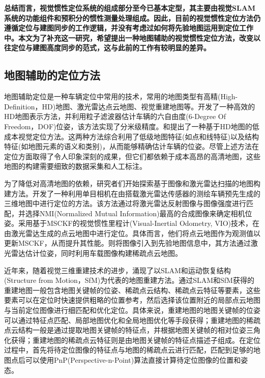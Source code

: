 \textbf{总结而言，视觉惯性定位系统的组成部分至今已基本定型，其主要由视觉SLAM系统的功能组件和预积分的惯性测量处理组成。因此，目前的视觉惯性定位方法仍遵循定位与建图同步的工作逻辑，并没有考虑过如何将先验地图运用到定位工作中。本文为了补充这一研究，希望提出一种地图辅助的视觉惯性定位方法，改变以往定位与建图高度同步的范式，这与此前的工作有较明显的差异。}

\subsection{地图辅助的定位方法}
地图辅助定位是一种车辆定位中常用的技术，常用的地图类型有高精(High-Definition，HD)地图、激光雷达点云地图、视觉重建地图等。\citet{jeong2020hdmi}开发了一种高效的HD地图表示方法，并利用粒子滤波器估计车辆的六自由度(6-Degree Of Freedom，DOF)位姿，该方法实现了分米级精度。\citet{xiao2020monocular}和\citet{guo2021coarse}提出了一种基于HD地图的低成本视觉定位方法。这两种方法综合利用了低级地图特征(如点和线特征)以及结构特征(如地图元素的语义和类别)，从而能够精确估计车辆的位姿。尽管上述方法在定位方面取得了令人印象深刻的成果，但它们都依赖于成本高昂的高清地图，这些地图的构建需要细致的数据采集和人工标注。

为了降低对高清地图的依赖，研究者们开始探索基于图像和激光雷达扫描的地图构建方法。\citet{stewart2012laps}开发了一种利用单目相机在由搭载激光雷达传感器的测绘车辆预先生成的三维地图中进行定位的方法。该方法通过将激光雷达反射图像与图像强度进行匹配，并选择NMI(Normalized Mutual Information)最高的合成图像来确定相机位姿。\citet{zuo2019visual}采用基于MSCKF的视觉惯性里程计(Visual-Inertial Odometry, VIO)技术，在由激光雷达生成的点云地图中进行定位。具体而言，他们将点云地图作为观测值以更新MSCKF，从而提升其性能。\citet{lin2021autonomous}则将图像引入到先验地图信息中，其方法通过激光雷达估计位姿，同时利用车载图像构建稀疏点云地图。

近年来，随着视觉三维重建技术的进步，涌现了以SLAM和运动恢复结构(Structure from Motion，SfM)\cite{schonberger2016structure}为代表的地图重建方法。通过SLAM和SfM获得的重建地图一般包含地图关键帧的位姿、稀疏点云结构、稀疏点云特征等要素，这些要素可以在定位时快速提供粗略的位置参考，然后选择该位置附近的局部点云地图与当前定位图像进行细匹配和优化定位。具体来说，重建地图的地图关键帧的位姿可以通过特征点匹配、局部地图优化和全局地图优化等手段获得；重建地图的稀疏点云结构一般是通过提取地图关键帧的特征点，并根据地图关键帧的相对位姿三角化获得；重建地图的稀疏点云特征则是由地图关键帧的特征点描述子组成。在定位过程中，首先将待定位图像的特征点与地图的稀疏点云进行匹配，匹配到足够的地图点后可以使用PnP(Perspective-n-Point)算法直接计算待定位图像的位置和姿态。

